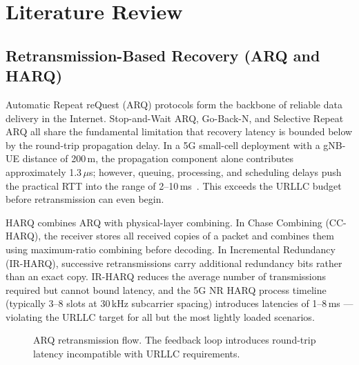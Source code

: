 \documentclass[conference]{IEEEtran}
\begin{document}
\section{Literature Review}
\label{sec:litreview}

\subsection{Retransmission-Based Recovery (ARQ and HARQ)}

Automatic Repeat reQuest (ARQ) protocols form the backbone of reliable
data delivery in the Internet. Stop-and-Wait ARQ, Go-Back-N, and
Selective Repeat ARQ all share the fundamental limitation that recovery
latency is bounded below by the round-trip propagation delay. In a 5G
small-cell deployment with a gNB-UE distance of 200\,m, the propagation
component alone contributes approximately 1.3\,$\mu$s; however, queuing,
processing, and scheduling delays push the practical RTT into the range
of 2--10\,ms~\cite{dahlman2018}. This exceeds the URLLC budget before
retransmission can even begin.

HARQ combines ARQ with physical-layer combining. In Chase Combining
(CC-HARQ), the receiver stores all received copies of a packet and
combines them using maximum-ratio combining before decoding. In
Incremental Redundancy (IR-HARQ), successive retransmissions carry
additional redundancy bits rather than an exact copy. IR-HARQ reduces the
average number of transmissions required but cannot bound latency, and
the 5G NR HARQ process timeline (typically 3--8 slots at 30\,kHz
subcarrier spacing) introduces latencies of 1--8\,ms --- violating the
URLLC target for all but the most lightly loaded scenarios.

\begin{figure}[!t]
\centering
{}
\caption{ARQ retransmission flow. The feedback loop introduces
  round-trip latency incompatible with URLLC requirements.}
\label{fig:arq}
\end{figure}
\end{document}
